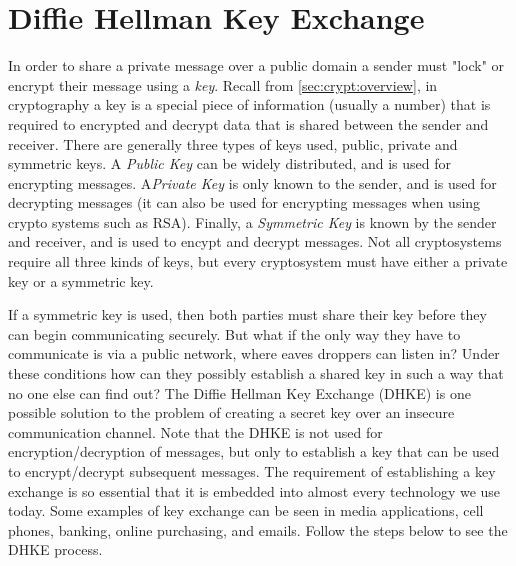 \section{Diffie Hellman Key Exchange}\label{sec:DHKE:1}

In order to share a private message over a public domain a sender must  "lock" or encrypt their message using a \emph{key}.  Recall from \ref{sec:crypt:overview}, in cryptography a  key is a special piece of information (usually a number)  that is required to encrypted and decrypt data that is shared between the sender and receiver. There are generally three types of keys used, public, private and symmetric keys. A \emph{Public Key} can be widely distributed, and is used for encrypting messages.  A\emph{Private Key} is only known to the sender, and is used for decrypting messages (it can also be used for encrypting messages when using crypto systems such as RSA).  Finally, a \emph{Symmetric Key} is known by the sender and receiver, and is used to encypt and decrypt messages.  Not all cryptosystems require all three kinds of keys, but every cryptosystem must have either a private key or a symmetric key.

  If a symmetric key is used, then both parties must share their key before they can begin communicating securely.  But what if the only way they have to communicate is via a public network, where eaves droppers can listen in?  Under these conditions how can they possibly establish a shared key in such a way that no one else can find out?  The Diffie Hellman Key Exchange (DHKE) is one possible solution to the problem of creating a secret key over an insecure communication channel.  Note that the DHKE is not used for encryption/decryption of messages, but only to establish a key that can be used to encrypt/decrypt subsequent messages.  The requirement of establishing a key exchange is so essential that it is embedded into almost every technology we use today.  Some examples of key exchange can be seen in media applications, cell phones, banking, online purchasing, and emails.  Follow the steps below to see the DHKE process.  


